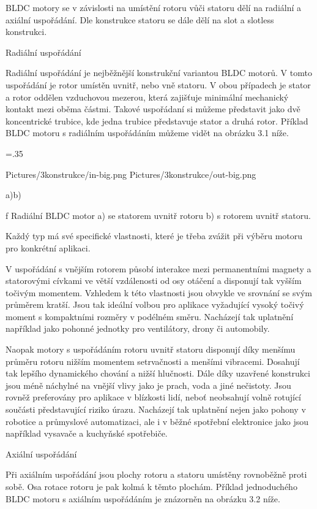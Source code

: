  BLDC motory se v závislosti na umístění rotoru vůči statoru dělí na radiální a axiální uspořádání. 
 Dle konstrukce statoru se dále dělí na slot a slotless konstrukci.

\secc Radiální uspořádání

Radiální uspořádání je nejběžnější konstrukční variantou BLDC motorů. 
V tomto uspořádání je rotor umístěn uvnitř, nebo vně statoru.
V obou případech je stator a rotor oddělen vzduchovou mezerou, která zajišťuje minimální mechanický kontakt mezi oběma částmi. 
Takové uspořádaní si můžeme představit jako dvě koncentrické trubice, kde jedna trubice představuje stator a druhá rotor.
Příklad BLDC motoru s radiálním uspořádáním můžeme vidět na obrázku 3.1 níže.

\medskip
\picw=.35\hsize
{} %
\centerline {\inspic Pictures/3konstrukce/in-big.png \hfil\hfil \inspic Pictures/3konstrukce/out-big.png }\nobreak
\centerline {a)\hfil\hfil b)}\nobreak\medskip
\caption/f Radiální BLDC motor a) se statorem uvnitř rotoru b) s rotorem uvnitř statoru.
 \medskip
 
 Každý typ má své specifické vlastnosti, které je třeba zvážit při výběru motoru pro konkrétní aplikaci.
  
V uspořádání s vnějším rotorem působí interakce mezi permanentními magnety a statorovými cívkami ve větší vzdálenosti
od osy otáčení a disponují tak vyšším točivým momentem. Vzhledem k této vlastnosti jsou obvykle ve srovnání se svým průměrem kratší.
Jsou tak ideální volbou pro aplikace vyžadující vysoký točivý moment s kompaktními rozměry v podélném směru.
Nacházejí tak uplatnění například jako pohonné jednotky pro ventilátory, drony či automobily.

Naopak motory s uspořádáním rotoru uvnitř statoru disponují díky menšímu průměru rotoru nižším momentem setrvačnosti a menšími vibracemi.
Dosahují tak lepšího dynamického chování a nižší hlučnosti. 
Dále díky uzavřené konstrukci jsou méně náchylné na vnější vlivy jako je prach, voda a jiné nečistoty. 
Jsou rovněž preferovány pro aplikace v blízkosti lidí, neboť neobsahují volně rotující součásti představující riziko úrazu.
Nacházejí tak uplatnění nejen jako pohony v robotice a průmyslové automatizaci, ale i v běžné spotřební elektronice jako 
jsou například vysavače a kuchyňské spotřebiče.

\secc Axiální uspořádání

Při axiálním uspořádání jsou plochy rotoru a statoru umístěny rovnoběžně proti sobě. Osa rotace rotoru je pak kolmá k těmto plochám.
Příklad jednoduchého BLDC motoru s axiálním uspořádáním je znázorněn na obrázku 3.2 níže. 

